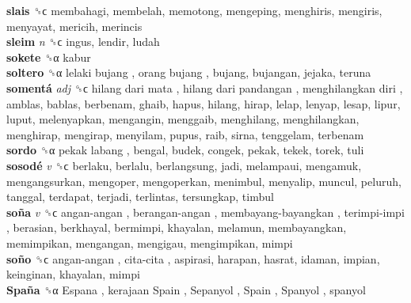 \textbf{slais} ␝ϲ  membahagi, membelah, memotong, mengeping, menghiris, mengiris, menyayat, mericih, merincis  \\
\textbf{sleim} \emph{n}  ␝ϲ  ingus, lendir, ludah  \\
\textbf{sokete} ␝α  kabur  \\
\textbf{soltero} ␝α   lelaki bujang ,  orang bujang , bujang, bujangan, jejaka, teruna  \\
\textbf{somentá} \emph{adj}  ␝ϲ   hilang dari mata ,  hilang dari pandangan ,  menghilangkan diri , amblas, bablas, berbenam, ghaib, hapus, hilang, hirap, lelap, lenyap, lesap, lipur, luput, melenyapkan, mengangin, menggaib, menghilang, menghilangkan, menghirap, mengirap, menyilam, pupus, raib, sirna, tenggelam, terbenam  \\
\textbf{sordo} ␝α   pekak labang , bengal, budek, congek, pekak, tekek, torek, tuli  \\
\textbf{sosodé} \emph{v}  ␝ϲ  berlaku, berlalu, berlangsung, jadi, melampaui, mengamuk, mengangsurkan, mengoper, mengoperkan, menimbul, menyalip, muncul, peluruh, tanggal, terdapat, terjadi, terlintas, tersungkap, timbul  \\
\textbf{soña} \emph{v}  ␝ϲ   angan-angan ,  berangan-angan ,  membayang-bayangkan ,  terimpi-impi , berasian, berkhayal, bermimpi, khayalan, melamun, membayangkan, memimpikan, mengangan, mengigau, mengimpikan, mimpi  \\
\textbf{soño} ␝ϲ   angan-angan ,  cita-cita , aspirasi, harapan, hasrat, idaman, impian, keinginan, khayalan, mimpi  \\
\textbf{Spaña} ␝α   Espana ,  kerajaan Spain ,  Sepanyol ,  Spain ,  Spanyol , spanyol  \\
